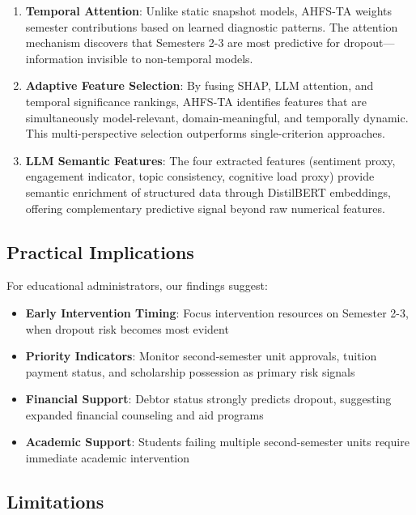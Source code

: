 \documentclass[journal]{IEEEtran}
\begin{document}
\begin{enumerate}
\item \textbf{Temporal Attention}: Unlike static snapshot models, AHFS-TA weights semester contributions based on learned diagnostic patterns. The attention mechanism discovers that Semesters 2-3 are most predictive for dropout---information invisible to non-temporal models.

\item \textbf{Adaptive Feature Selection}: By fusing SHAP, LLM attention, and temporal significance rankings, AHFS-TA identifies features that are simultaneously model-relevant, domain-meaningful, and temporally dynamic. This multi-perspective selection outperforms single-criterion approaches.

\item \textbf{LLM Semantic Features}: The four extracted features (sentiment proxy, engagement indicator, topic consistency, cognitive load proxy) provide semantic enrichment of structured data through DistilBERT embeddings, offering complementary predictive signal beyond raw numerical features.
\end{enumerate}

\subsection{Practical Implications}

For educational administrators, our findings suggest:

\begin{itemize}
\item \textbf{Early Intervention Timing}: Focus intervention resources on Semester 2-3, when dropout risk becomes most evident
\item \textbf{Priority Indicators}: Monitor second-semester unit approvals, tuition payment status, and scholarship possession as primary risk signals
\item \textbf{Financial Support}: Debtor status strongly predicts dropout, suggesting expanded financial counseling and aid programs
\item \textbf{Academic Support}: Students failing multiple second-semester units require immediate academic intervention
\end{itemize}

\subsection{Limitations}
\end{document}
